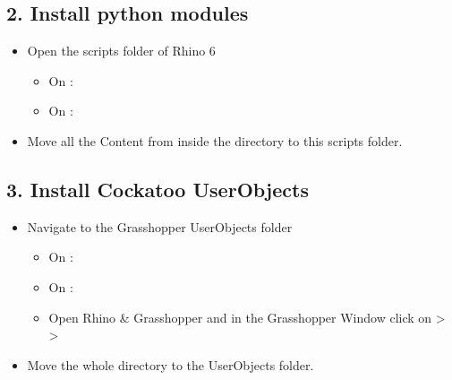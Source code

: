 \documentclass[letterpaper,10pt,english]{sphinxmanual}
\begin{document}
\subsection{2. Install python modules}
\label{\detokenize{README:install-python-modules}}\label{\detokenize{README:id3}}\begin{itemize}
\item {} 
Open the scripts folder of Rhino 6
\begin{itemize}
\item {} 
On :

\item {} 
On :

\end{itemize}

\item {} 
Move all the Content from inside the  directory to this
scripts folder.

\end{itemize}


\subsection{3. Install Cockatoo UserObjects}
\label{\detokenize{README:install-cockatoo-userobjects}}\label{\detokenize{README:id4}}\begin{itemize}
\item {} 
Navigate to the Grasshopper UserObjects folder
\begin{itemize}
\item {} 
On :

\item {} 
On :

\item {} 
 Open Rhino \& Grasshopper and in the Grasshopper
Window click on  \textgreater{}  \textgreater{}

\end{itemize}

\item {} 
Move the whole  directory to the UserObjects folder.

\end{itemize}
\end{document}
